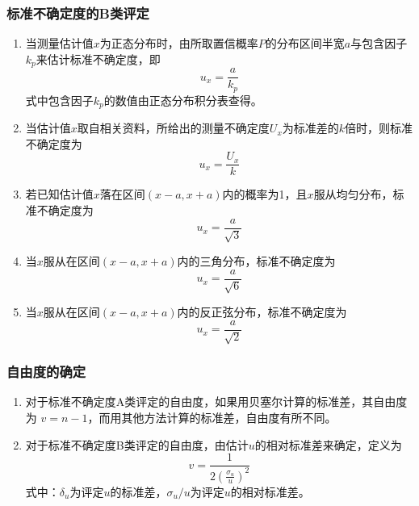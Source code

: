 \subsubsection{标准不确定度的B类评定}
\begin{enumerate}
	\item 当测量估计值$ x $为正态分布时，由所取置信概率$ P $的分布区间半宽$ a $与包含因子$ k_p $来估计标准不确定度，即\begin{equation} u_x=\frac{a}{k_p} \end{equation}
	式中包含因子$ k_p $的数值由正态分布积分表查得。
	\item 当估计值$ x $取自相关资料，所给出的测量不确定度$ U_x $为标准差的$ k $倍时，则标准不确定度为\begin{equation} u_x=\frac{U_x}{k} \end{equation}
	\item 若已知估计值$ x $落在区间$ (x-a,x+a) $内的概率为1，且$ x $服从均匀分布，标准不确定度为\begin{equation} u_x=\frac{a}{\sqrt{3}} \end{equation}
	\item 当$ x $服从在区间$ (x-a,x+a) $内的三角分布，标准不确定度为\begin{equation} u_x=\frac{a}{\sqrt{6}} \end{equation}
	\item 当$ x $服从在区间$ (x-a,x+a) $内的反正弦分布，标准不确定度为\begin{equation} u_x=\frac{a}{\sqrt{2}} \end{equation}
\end{enumerate}
\subsubsection{自由度的确定}
\begin{enumerate}
	\item 对于标准不确定度A类评定的自由度，如果用贝塞尔计算的标准差，其自由度为 $ v=n-1 $，而用其他方法计算的标准差，自由度有所不同。
	\item 对于标准不确定度B类评定的自由度，由估计$ u $的相对标准差来确定，定义为\begin{equation} v=\frac{1}{2(\frac{\sigma_u}{u})^2} \end{equation}
	式中：$ \delta_u $为评定$ u $的标准差，$ \sigma_u/u $为评定$ u $的相对标准差。
\end{enumerate}
